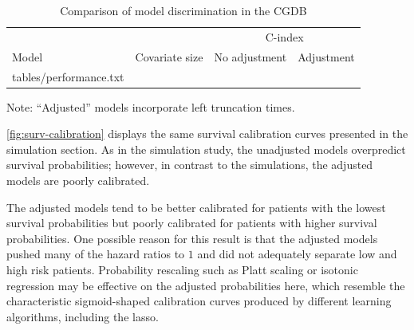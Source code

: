 \documentclass[11pt,final,fleqn]{article}\usepackage[]{graphicx}\usepackage[]{color}
\makeatletter
\theoremstyle{plain}
\newcommand*\ExpandableInput[1]{\@@input#1 }
\makeatother
\begin{document}
\begin{table}[!ht]
\begin{center}
\begin{threeparttable}
\caption{Comparison of model discrimination in the CGDB} \label{tbl:model-discrimination}
\begin{tabularx}{\textwidth}{@{\extracolsep{\fill}}llrr}
\hline
\multicolumn{2}{l}{} & \multicolumn{2}{c}{C-index}  \\
\cmidrule(r){3-4}  
\multicolumn{1}{l}{Model} & \multicolumn{1}{l}{Covariate size} & \multicolumn{1}{l}{No adjustment} & \multicolumn{1}{l}{Adjustment}  \\
\hline
\ExpandableInput{tables/performance.txt}
\hline
\end{tabularx}
\scriptsize Note: ``Adjusted'' models incorporate left truncation times.
\end{threeparttable}
\end{center}
\end{table}

\autoref{fig:surv-calibration} displays the same survival calibration curves presented in the simulation section. As in the simulation study, the unadjusted models overpredict survival probabilities; however, in contrast to the simulations, the adjusted models are poorly calibrated. 

The adjusted models tend to be better calibrated for patients with the lowest survival probabilities but poorly calibrated for patients with higher survival probabilities. One possible reason for this result is that the adjusted models pushed many of the hazard ratios to $1$ and did not adequately separate low and high risk patients. Probability rescaling such as Platt scaling or isotonic regression may be effective on the adjusted probabilities here, which resemble the characteristic sigmoid-shaped calibration curves produced by different learning algorithms, including the lasso.
\end{document}
